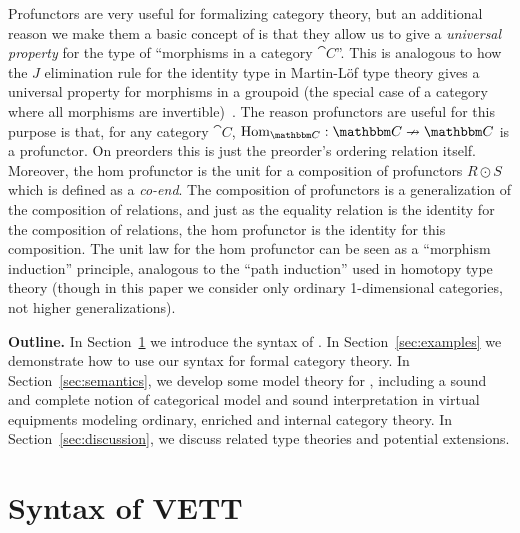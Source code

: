 \documentclass{llncs}
\begin{document}
Profunctors are very useful for formalizing category theory, but an
additional reason we make them a basic concept of \vett{} is that they
allow us to give a \emph{universal property} for the type of ``morphisms
in a category ${\cat C}$''.  This is analogous to how the $J$
elimination rule for the identity type in Martin-L\"of type theory gives
a universal property for morphisms in a groupoid (the special case of a
category where all morphisms are
invertible)~\cite{hofmann98groupoid,awodeywarren09identity,voevodsky06homotopy}. The reason
profunctors are useful for this purpose is that, for any category $\cat
C$, $\text{Hom}_{\cat C} : \cat C \pto \cat C$ is a profunctor. On
preorders this is just the preorder's ordering relation
itself. Moreover, the hom profunctor is the unit for a composition of
profunctors $R \odot S$ which is defined as a \emph{co-end}.
The composition of profunctors is a generalization of the composition of
relations, and just as the equality relation is the identity for the
composition of relations, the hom profunctor is the identity for this
composition.  The unit law for the hom profunctor can be seen as a
``morphism induction'' principle, analogous to the ``path induction''
used in homotopy type theory (though in this paper we consider only
ordinary 1-dimensional categories, not higher generalizations).

\textbf{Outline.}  In Section~\ref{sec:syntax} we introduce the syntax
of \vett{}.  In Section~\ref{sec:examples} we demonstrate how to use our
syntax for formal category theory.  In Section~\ref{sec:semantics}, we
develop some model theory for \vett{}, including a sound and complete
notion of categorical model and sound interpretation in virtual
equipments modeling ordinary, enriched and internal category theory.  In
Section~\ref{sec:discussion}, we discuss related type theories and
potential extensions.

\section{Syntax of VETT}
\label{sec:syntax}
\end{document}
